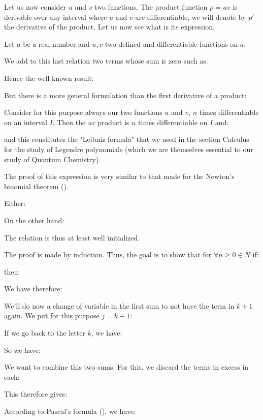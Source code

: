 \begin{enumerate}
		 Let us now consider $u$ and $v$ two functions. The product function $p=uv$ is derivable over any interval where $u$ and $v$ are differentiable, we will denote by $p'$ the derivative of the product. Let us now see what is its expression.
		 
		 Let $a$ be a real number and $u,v$ two defined and differentiable functions on $a$:
		 
		 
		 We add to this last relation two terms whose sum is zero such as:
		 
		 Hence the well known result:
		
		 But there is a more general formulation than the first derivative of a product:
		 \begin{theorem}
		 	Consider for this purpose always our two functions $u$ and $v$, $n$ times differentiable on an interval $I$. Then the $uv$ product is $n$ times differentiable on $I$ and:
		 		 	
		 	and this constitutes the "Leibniz formula" that we used in the section Calculus for the study of Legendre polynomials (which we are themselves essential to our study of Quantum Chemistry).
		 	
		 	The proof of this expression is very similar to that made for the Newton's binomial theorem ().
		 \end{theorem}
		 \begin{dem}
		 	Either:
		 	
		 	On the other hand:
		 	
		 	The relation is thus at least well initialized.
		 	
		 	The proof is made by induction. Thus, the goal is to show that for $\forall n \geq 0 \in N$ if:
		 	
		 	then:
		 	
		 	We have therefore:
		 	
		 	We'll do now a change of variable in the first sum to not have the term in $k + 1$ again. We put for this purpose $j=k+1$:
		 	
		 	If we go back to the letter $k$, we have:
		 	
		 	So we have:
		 	
		 	We want to combine this two sums. For this, we discard the terms in excess in each:
		 	
		 	This therefore gives:
		 	
		 	According to Pascal's formula (), we have:
		 	

\end{dem}
\end{enumerate}
